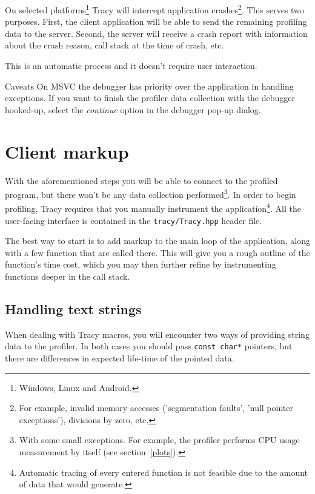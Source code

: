 \documentclass[hidelinks,titlepage,a4paper]{article}
\begin{document}
On selected platforms\footnote{Windows, Linux and Android.} Tracy will intercept application crashes\footnote{For example, invalid memory accesses ('segmentation faults', 'null pointer exceptions'), divisions by zero, etc.}. This serves two purposes. First, the client application will be able to send the remaining profiling data to the server. Second, the server will receive a crash report with information about the crash reason, call stack at the time of crash, etc.

This is an automatic process and it doesn't require user interaction.

\begin{bclogo}[
noborder=true,
couleur=black!5,
logo=\bcattention
]{Caveats}
On MSVC the debugger has priority over the application in handling exceptions. If you want to finish the profiler data collection with the debugger hooked-up, select the \emph{continue} option in the debugger pop-up dialog.
\end{bclogo}

\section{Client markup}
\label{client}

With the aforementioned steps you will be able to connect to the profiled program, but there won't be any data collection performed\footnote{With some small exceptions. For example, the profiler performs CPU usage measurement by itself (see section~\ref{plots}).}. In order to begin profiling, Tracy requires that you manually instrument the application\footnote{Automatic tracing of every entered function is not feasible due to the amount of data that would generate.}. All the user-facing interface is contained in the \texttt{tracy/Tracy.hpp} header file.

The best way to start is to add markup to the main loop of the application, along with a few function that are called there. This will give you a rough outline of the function's time cost, which you may then further refine by instrumenting functions deeper in the call stack.

\subsection{Handling text strings}

When dealing with Tracy macros, you will encounter two ways of providing string data to the profiler. In both cases you should pass \texttt{const char*} pointers, but there are differences in expected life-time of the pointed data.
\end{document}
